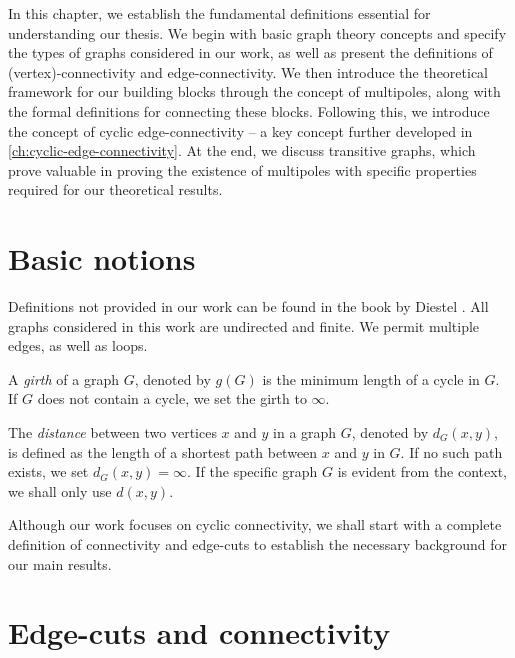 \documentclass[12pt, twoside]{book}
\begin{document}




In this chapter, we establish the fundamental definitions essential for understanding our thesis. We begin with basic graph theory concepts and specify the types of graphs considered in our work, as well as present the definitions of (vertex)-connectivity and edge-connectivity. We then introduce the theoretical framework for our building blocks through the concept of multipoles, along with the formal definitions for connecting these blocks. Following this, we introduce the concept of cyclic edge-connectivity -- a key concept further developed in \cref{ch:cyclic-edge-connectivity}. At the end, we discuss transitive graphs, which prove valuable in proving the existence of multipoles with specific properties required for our theoretical results.

\section{Basic notions}

Definitions not provided in our work can be found in the book  by Diestel \cite{Diestel}. All graphs considered in this work are undirected and finite. We permit multiple edges, as well as loops.

A \textit{girth} of a graph $G$, denoted by $g(G)$ is the minimum length of a cycle in $G$. If $G$ does not contain a cycle, we set the girth to $\infty$.

The \textit{distance} between two vertices $x$ and $y$ in a graph $G$, denoted by $d_G(x,y)$, is defined as the length of a shortest path between $x$ and $y$ in $G$. If no such path exists, we set $d_G(x,y)=\infty$. If the specific graph $G$ is evident from the context, we shall only use $d(x,y)$.

Although our work focuses on cyclic connectivity, we shall start with a complete definition of connectivity and edge-cuts to establish the necessary background for our main results.

\section{Edge-cuts and connectivity}\label{sec:edge-cuts}
\end{document}

